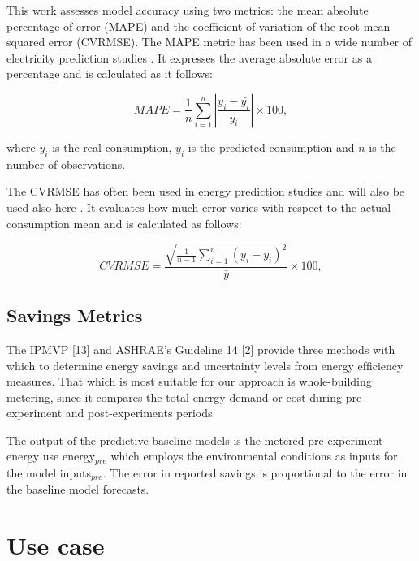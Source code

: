 \documentclass[10pt, conference, compsocconf]{IEEEtran}
\begin{document}
This work assesses model accuracy using two metrics: the mean absolute percentage of error (MAPE) and the coefficient of variation of the root mean squared error (CVRMSE).
The MAPE metric has been used in a wide number of electricity prediction studies \cite{fan2014development, edwards2012predicting}
. It expresses the average absolute error as a percentage and is calculated as it follows:

\[
 MAPE = \frac{1}{n}\sum_{i=1}^{n} |\frac{y_i-\bar{y_i}}{y_i}|\times 100,
\]

where $y_i$ is the real consumption, $\bar{y_i}$ is the predicted consumption and $n$ is the number of observations.

The CVRMSE has often been used in energy prediction studies \cite{quilumba2015using} and will also be used also here %
. It evaluates how much error varies with respect
to the actual consumption mean and is calculated as follows:

\[
 CVRMSE = \frac{\sqrt{\frac{1}{n-1}\sum_{i=1}^{n}(y_i-\bar{y_i})^2}}{\bar{y}} \times 100,
\]


\subsection{Savings Metrics}

The IPMVP [13] and ASHRAE’s Guideline 14 [2] provide three methods with which to determine energy savings and uncertainty levels from energy efﬁciency measures. That which is most suitable for our approach is whole-building metering, since it compares the total energy demand or cost during pre-experiment and post-experiments periods.


The output of the predictive baseline models is the metered pre-experiment energy use energy$_{pre}$ which employs the environmental conditions as inputs for the model inputs$_{pre}$. The error in reported savings is proportional to the error in the baseline model forecasts.


\section{Use case}
\end{document}

